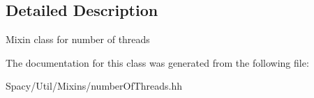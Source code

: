 \subsection{Detailed Description}
Mixin class for number of threads 

The documentation for this class was generated from the following file\+:\begin{DoxyCompactItemize}
\item 
Spacy/\+Util/\+Mixins/number\+Of\+Threads.\+hh\end{DoxyCompactItemize}
